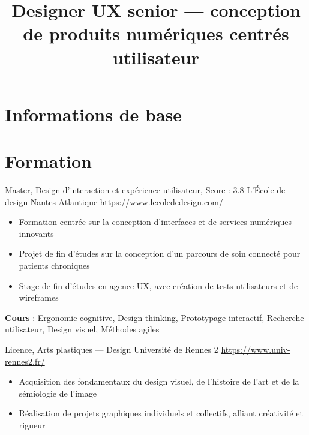 \documentclass[a4paper, serif, 10pt]{moderncv}
\title{Designer UX senior — conception de produits numériques centrés utilisateur}
\begin{document}
\maketitle

\section{Informations de base}

\section{Formation}

        {Master, Design d'interaction et expérience utilisateur, Score : 3.8}
        {L'École de design Nantes Atlantique}
        {\url{https://www.lecolededesign.com/}}
        {}
        {\begin{itemize}
\item Formation centrée sur la conception d'interfaces et de services numériques innovants
\item Projet de fin d'études sur la conception d'un parcours de soin connecté pour patients chroniques
\item Stage de fin d'études en agence UX, avec création de tests utilisateurs et de wireframes
\end{itemize}
\textbf{Cours} : Ergonomie cognitive, Design thinking, Prototypage interactif, Recherche utilisateur, Design visuel, Méthodes agiles}

        {Licence, Arts plastiques — Design}
        {Université de Rennes 2}
        {\url{https://www.univ-rennes2.fr/}}
        {}
        {\begin{itemize}
\item Acquisition des fondamentaux du design visuel, de l'histoire de l'art et de la sémiologie de l'image
\item Réalisation de projets graphiques individuels et collectifs, alliant créativité et rigueur
\end{itemize}}
\end{document}
